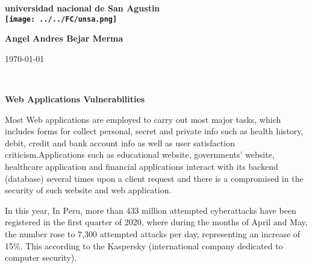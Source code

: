 \documentclass[12pt]{article}
\begin{document}
\begin{center}
\bf{\sc\Huge universidad nacional de San Agustin}\\
\vspace{20pt}
\texttt{[image: ../../FC/unsa.png]} 
\end{center}
\vspace{120pt}
\begin{center}
\bf{\sc\Huge Angel Andres Bejar Merma }\\
\end{center}
\vspace{150pt}
\begin{center}
\bf{\sc\Huge \today\par }
\end{center}
\begin{center}

\end{center}\
\newpage



\begin{center}

\bf{\sc\Huge Web Applications Vulnerabilities }\\
\end{center}
\begin{flushleft}
\vspace{25PT}
\large



\end{flushleft}
\vspace{25PT}
\large

Most   Web applications are employed to
carry out most major tasks, which includes forms for collect personal, secret and private info such as health history, debit,
credit and bank account info as well as user satisfaction criticism.Applications such as educational website, governments’
website, healthcare application and financial applications interact with its backend (database) several times upon a
client request and there is a compromised in the security of such website and web application.


\vspace{15PT}



In this year, 
In Peru, more than 433 million attempted cyberattacks have been registered in the first quarter of 2020, where during the months of April and May, the number rose to 7,300 attempted attacks per day, representing an increase of 15\%.
This  according to the 
Kaspersky (international company dedicated to computer security).
\\
\end{document}
